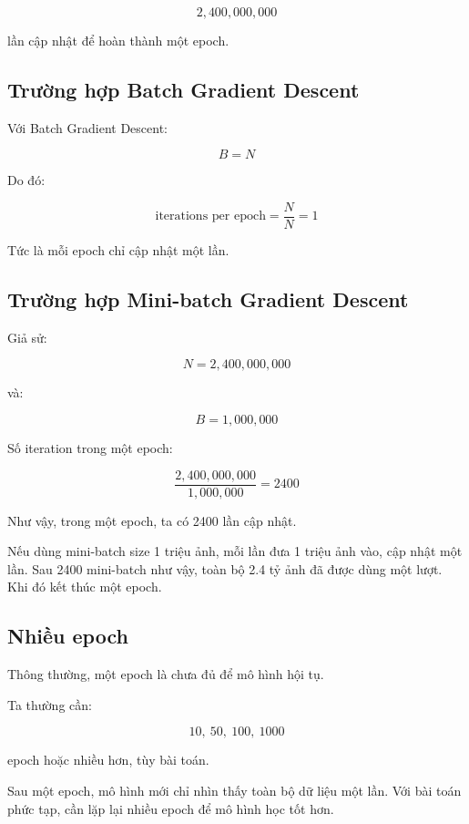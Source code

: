\[
    2,400,000,000
\]

lần cập nhật để hoàn thành một epoch.

\subsection{Trường hợp Batch Gradient Descent}

Với Batch Gradient Descent:

\[
    B=N
\]

Do đó:

\[
    \text{iterations per epoch}
    =
    \frac{N}{N}
    =
    1
\]

Tức là mỗi epoch chỉ cập nhật một lần.

\subsection{Trường hợp Mini-batch Gradient Descent}

Giả sử:

\[
    N=2,400,000,000
\]

và:

\[
    B=1,000,000
\]

Số iteration trong một epoch:

\[
    \frac{2,400,000,000}{1,000,000}
    =
    2400
\]

Như vậy, trong một epoch, ta có 2400 lần cập nhật.

\begin{vidu}
Nếu dùng mini-batch size 1 triệu ảnh, mỗi lần đưa 1 triệu ảnh vào, cập nhật một lần. Sau 2400 mini-batch như vậy, toàn bộ 2.4 tỷ ảnh đã được dùng một lượt. Khi đó kết thúc một epoch.
\end{vidu}

\subsection{Nhiều epoch}

Thông thường, một epoch là chưa đủ để mô hình hội tụ.

Ta thường cần:

\[
    10,\ 50,\ 100,\ 1000
\]

epoch hoặc nhiều hơn, tùy bài toán.

\begin{ghinho}
Sau một epoch, mô hình mới chỉ nhìn thấy toàn bộ dữ liệu một lần. Với bài toán phức tạp, cần lặp lại nhiều epoch để mô hình học tốt hơn.
\end{ghinho}

